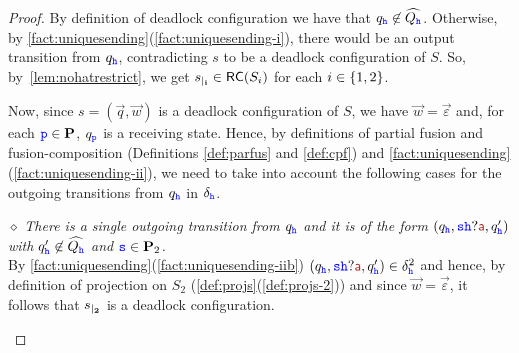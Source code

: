\begin{proof}
By definition of deadlock configuration we have that
$q_{{\mathtt{\color{blue}{ {h}}}}}\not\in\widehat{Q_{{\mathtt{\color{blue}{ {h}}}}}}$.
Otherwise, by  \cref{fact:uniquesending}(\ref{fact:uniquesending-i}), 
there would be an output transition from $q_{{\mathtt{\color{blue}{ {h}}}}}$, contradicting $s$ to be a deadlock configuration of $S$.
So, by~\cref{lem:nohatrestrict}, we get ${s}_{\mid_{\mathbf{i}}}\in \mathsf{RC}(S_i)$ for each $i\in \{1,2\}$.

Now, since $s= (\vec{q},\vec{w})$ is a deadlock configuration of $S$, we have $\vec{w}=\vec{\varepsilon}$ and, for each ${\mathtt{\color{blue}{ {p}}}}\in\mathbf{P}$, $q_{\mathtt{\color{blue}{ {p}}}}$  is a receiving state.
Hence, by definitions of  partial fusion and fusion-composition 
(Definitions \ref{def:parfus} and \ref{def:cpf}) and \cref{fact:uniquesending}(\ref{fact:uniquesending-ii}),
we need  to 
take into account the following cases for the outgoing transitions from $q_{{\mathtt{\color{blue}{ {h}}}}}$  in 
$\delta_{{\mathtt{\color{blue}{ {h}}}}}$.

\begin{description}  
  \item
\underline{$\diamond$} 
{\em  There is a single outgoing transition from $q_{\mathtt{\color{blue}{ {h}}}}$ and it is of the form
$(q_{\HH},\tts{\HH}?\msg[a],q'_\hh)$ with $q'_{\mathtt{\color{blue}{ {h}}}}\not\in\widehat{Q_{\mathtt{\color{blue}{ {h}}}}}$ and ${\mathtt{\color{blue}{ {s}}}}\in\mathbf{P}_2$.}\\
 By \cref{fact:uniquesending}(\ref{fact:uniquesending-iib})
 $(q_{\HH},\tts{\HH}?\msg[a],q'_\hh)\in\delta^2_\hh$ and hence, by definition of projection
 on $S_2$ (\cref{def:projs}(\ref{def:projs-2})) and since $\vec{w}=\vec{\varepsilon}$,
 it follows that ${s}_{\mid_{\mathbf{2}}}$ is a deadlock configuration.
  


\end{description}
\end{proof}
